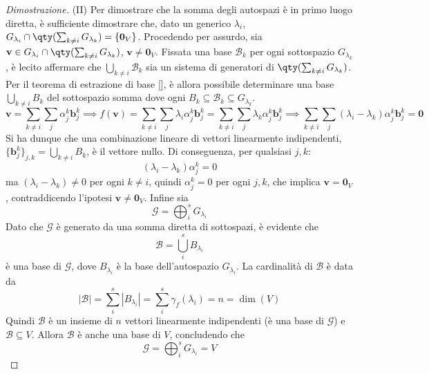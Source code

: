 \begin{proof}[Dimostrazione]
        \vspace{10pt}
        (II)
        Per dimostrare che la somma degli autospazi è in primo luogo diretta, è sufficiente dimostrare che, dato un generico $\lambda_i$, $G_{\lambda_i} \cap \qty(\sum_{k \neq i} G_{\lambda_k}) = \{ \mathbf{0}_V \}$.
        Procedendo per assurdo, sia $\mathbf{v} \in G_{\lambda_i} \cap \qty(\sum_{k \neq i} G_{\lambda_k})$, $\mathbf{v} \neq \mathbf{0}_V$. 
        Fissata una base $\mathcal{B}_k$ per ogni sottospazio $G_{\lambda_k}$, è lecito affermare che $\bigcup_{k \neq i} \mathcal{B}_k$ sia un sistema di generatori di $\qty(\sum_{k \neq i} G_{\lambda_k})$.
        Per il teorema di estrazione di base [], è allora possibile determinare una base $\bigcup_{k \neq i} B_k$ del sottospazio somma dove ogni $B_k \subseteq \mathcal{B}_k \subseteq G_{\lambda_k}$.
        \[
           \mathbf{v} = \sum_{k \neq i} \sum_{j} \alpha_j^k \mathbf{b}_j^k \implies f(\mathbf{v}) = \sum_{k \neq i} \sum_{j} \lambda_i \alpha_j^k \mathbf{b}_j^k = \sum_{k \neq i} \sum_{j} \lambda_k \alpha_j^k \mathbf{b}_j^k \implies \sum_{k \neq i} \sum_{j} (\lambda_i - \lambda_k) \alpha_j^k \mathbf{b}_j^k = \mathbf{0}
        \]
        Si ha dunque che una combinazione lineare di vettori linearmente indipendenti, $\{\mathbf{b}_j^k\}_{j, k} = \bigcup_{k \neq i} B_{k}$, è il vettore nullo. Di conseguenza, per qualsiasi $j, k$:
        \[
            (\lambda_i - \lambda_k) \alpha_j^k = 0
        \]
        ma $(\lambda_i - \lambda_k) \neq 0$ per ogni $k \neq i$, quindi $\alpha_j^k = 0$ per ogni $j, k$, che implica $\mathbf{v} = \mathbf{0}_V$, contraddicendo l'ipotesi $\mathbf{v} \neq \mathbf{0}_V$.
        Infine sia
        \[
            \mathcal{G} = \bigoplus_{i}^{s} G_{\lambda_i}
        \]
        Dato che $\mathcal{G}$ è generato da una somma diretta di sottospazi, è evidente che
        \[
            \mathcal{B} = \bigcup_{i}^{s} B_{\lambda_i}
        \]
        è una base di $\mathcal{G}$, dove $B_{\lambda_i}$ è la base dell'autospazio $G_{\lambda_i}$. La cardinalità di $\mathcal{B}$ è data da
        \[
            |\mathcal{B}| = \sum_{i}^{s} |B_{\lambda_i}| = \sum_{i}^{s} \gamma_{f}(\lambda_i) = n = \dim(V)
        \]
        Quindi $\mathcal{B}$ è un insieme di $n$ vettori linearmente indipendenti (è una base di $\mathcal{G}$) e $\mathcal{B} \subseteq V$. Allora $\mathcal{B}$ è anche una base di $V$, concludendo che
        \[
            \mathcal{G} = \bigoplus_{i}^{s} G_{\lambda_i} = V
        \]

    \end{proof}




